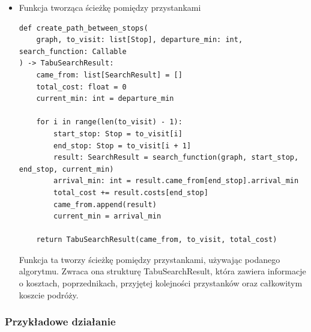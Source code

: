 \documentclass[a4paper, 12pt]{article}
\begin{document}
\begin{itemize}
    \item Funkcja tworząca ścieżkę pomiędzy przystankami
\begin{lstlisting}
def create_path_between_stops(
    graph, to_visit: list[Stop], departure_min: int, search_function: Callable
) -> TabuSearchResult:
    came_from: list[SearchResult] = []
    total_cost: float = 0
    current_min: int = departure_min

    for i in range(len(to_visit) - 1):
        start_stop: Stop = to_visit[i]
        end_stop: Stop = to_visit[i + 1]
        result: SearchResult = search_function(graph, start_stop, end_stop, current_min)
        arrival_min: int = result.came_from[end_stop].arrival_min
        total_cost += result.costs[end_stop]
        came_from.append(result)
        current_min = arrival_min

    return TabuSearchResult(came_from, to_visit, total_cost)
\end{lstlisting}
    Funkcja ta tworzy ścieżkę pomiędzy przystankami, używając podanego algorytmu.
    Zwraca ona strukturę TabuSearchResult, która zawiera informacje o kosztach, poprzednikach, przyjętej kolejności
    przystanków oraz całkowitym koszcie podróży.
\end{itemize}


\subsubsection{Przykładowe działanie}
\end{document}

